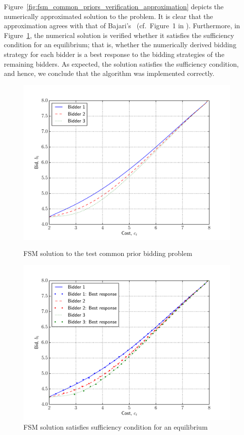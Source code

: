 Figure~\ref{fig:fsm_common_priors_verification_approximation} depicts the numerically approximated solution to the problem. It is clear that the approximation agrees with that of Bajari's~\cite{Bajari2001a} (cf.~Figure~1 in \cite{Bajari2001a}). Furthermore, in Figure~\ref{fig:fsm_common_priors_verification_sufficiency_approximation}, the numerical solution is verified whether it satisfies the sufficiency condition for an equilibrium; that is, whether the numerically derived bidding strategy for each bidder is a best response to the bidding strategies of the remaining bidders. As expected, the solution satisfies the sufficiency condition, and hence, we conclude that the algorithm was implemented correctly.

\begin{figure}[p!]
  \includegraphics[width=\figsize]{Approximation/Figures/fsm_common_priors_verification}
  \caption{FSM solution to the test common prior bidding problem}
  \label{fig:fsm_common_priors_verification_approximation}
  \vspace{10mm}
  \includegraphics[width=\figsize]{Approximation/Figures/fsm_common_priors_verification_sufficiency}
  \caption{FSM solution satisfies sufficiency condition for an equilibrium}
  \label{fig:fsm_common_priors_verification_sufficiency_approximation}
\end{figure}

